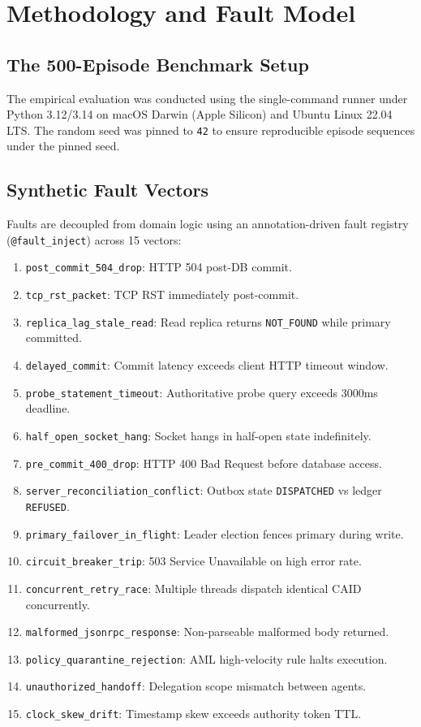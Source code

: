 \documentclass[10pt,journal,compsoc]{IEEEtran}
\begin{document}
\section{Methodology and Fault Model}

\subsection{The 500-Episode Benchmark Setup}
The empirical evaluation was conducted using the single-command runner under Python 3.12/3.14 on macOS Darwin (Apple Silicon) and Ubuntu Linux 22.04 LTS. The random seed was pinned to \texttt{42} to ensure reproducible episode sequences under the pinned seed.

\subsection{Synthetic Fault Vectors}
Faults are decoupled from domain logic using an annotation-driven fault registry (\texttt{@fault\_inject}) across 15 vectors:
\begin{enumerate}
    \item \texttt{post\_commit\_504\_drop}: HTTP 504 post-DB commit.
    \item \texttt{tcp\_rst\_packet}: TCP RST immediately post-commit.
    \item \texttt{replica\_lag\_stale\_read}: Read replica returns \texttt{NOT\_FOUND} while primary committed.
    \item \texttt{delayed\_commit}: Commit latency exceeds client HTTP timeout window.
    \item \texttt{probe\_statement\_timeout}: Authoritative probe query exceeds 3000ms deadline.
    \item \texttt{half\_open\_socket\_hang}: Socket hangs in half-open state indefinitely.
    \item \texttt{pre\_commit\_400\_drop}: HTTP 400 Bad Request before database access.
    \item \texttt{server\_reconciliation\_conflict}: Outbox state \texttt{DISPATCHED} vs ledger \texttt{REFUSED}.
    \item \texttt{primary\_failover\_in\_flight}: Leader election fences primary during write.
    \item \texttt{circuit\_breaker\_trip}: 503 Service Unavailable on high error rate.
    \item \texttt{concurrent\_retry\_race}: Multiple threads dispatch identical CAID concurrently.
    \item \texttt{malformed\_jsonrpc\_response}: Non-parseable malformed body returned.
    \item \texttt{policy\_quarantine\_rejection}: AML high-velocity rule halts execution.
    \item \texttt{unauthorized\_handoff}: Delegation scope mismatch between agents.
    \item \texttt{clock\_skew\_drift}: Timestamp skew exceeds authority token TTL.
\end{enumerate}
\end{document}
